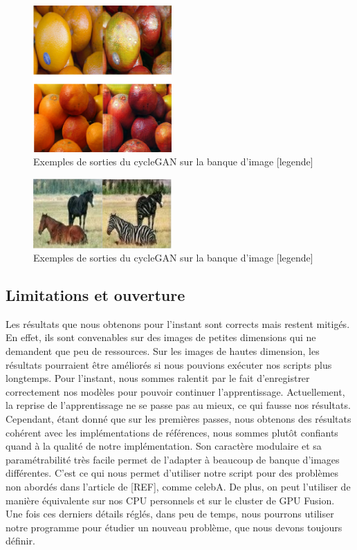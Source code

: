 \begin{figure}[!h]
\centering
\includegraphics[width=150pt]{"images/cycleRes2"}
\caption{Exemples de sorties du cycleGAN sur la banque d'image [legende]}
\end{figure}

\begin{figure}[!h]
\centering
\includegraphics[width=150pt]{"images/cycleRes3"}
\caption{Exemples de sorties du cycleGAN sur la banque d'image [legende]}
\end{figure}

\subsection{Limitations et ouverture}

Les résultats que nous obtenons pour l'instant sont corrects mais restent mitigés. En effet, ils sont convenables sur des images de petites dimensions qui ne demandent que peu de ressources. Sur les images de hautes dimension, les résultats pourraient être améliorés si nous pouvions exécuter nos scripts plus longtemps. Pour l'instant, nous sommes ralentit par le fait d'enregistrer correctement nos modèles pour pouvoir continuer l'apprentissage. Actuellement, la reprise de l'apprentissage ne se passe pas au mieux, ce qui fausse nos résultats.\\

Cependant, étant donné que sur les premières passes, nous obtenons des résultats cohérent avec les implémentations de références, nous sommes plutôt confiants quand à la qualité de notre implémentation. Son caractère modulaire et sa paramétrabilité très facile permet de l'adapter à beaucoup de banque d'images différentes. C'est ce qui nous permet d'utiliser notre script pour des problèmes non abordés dans l'article de [REF], comme celebA. De plus, on peut l'utiliser de manière équivalente sur nos CPU personnels et sur le cluster de GPU Fusion.\\

Une fois ces derniers détails réglés, dans peu de temps, nous pourrons utiliser notre programme pour étudier un nouveau problème, que nous devons toujours définir.


